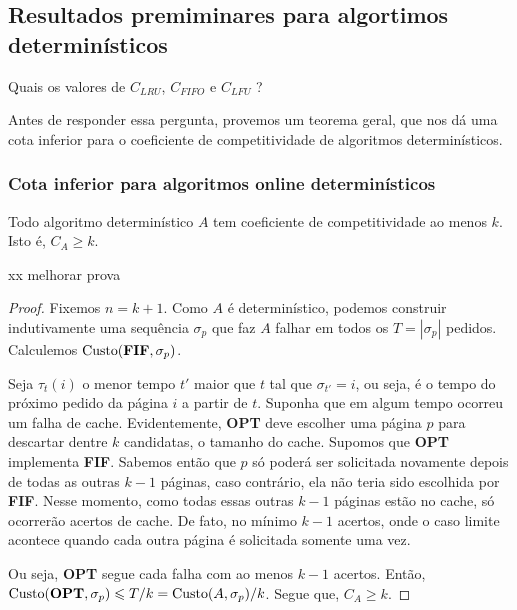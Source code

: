 \subsection{Resultados premiminares para algortimos determinísticos}

\begin{question}
  Quais os valores de \(C_{LRU}\), \(C_{FIFO}\) e \(C_{LFU}\) ?
\end{question}

Antes de responder essa pergunta, provemos um teorema geral, que nos dá uma cota inferior para o coeficiente de competitividade de algoritmos determinísticos.

\subsubsection{Cota inferior para algoritmos online determinísticos}

\begin{theorem}
\label{teorema1}
Todo algoritmo determinístico \(A\) tem coeficiente de competitividade ao menos \(k\). Isto é, \(C_A \geqslant k\).
\end{theorem}

 xx melhorar prova
\begin{proof}

  Fixemos \(n = k + 1\). Como \(A\) é determinístico, podemos construir indutivamente uma sequência \(\sigma_p\) que faz \(A\) falhar em todos os \(T = |\sigma_p|\) pedidos. Calculemos \(\text{Custo}(\bold{FIF}, \sigma_p)\). 

  Seja \(\tau_t(i)\) o menor tempo \(t'\) maior que \(t\) tal que \(\sigma_{t'} = i\), ou seja, é o tempo do próximo pedido da página \(i\) a partir de \(t\). Suponha que em algum tempo ocorreu um falha de cache. Evidentemente, \textbf{OPT} deve escolher uma página \(p\) para descartar dentre \(k\) candidatas, o tamanho do cache. Supomos que \textbf{OPT} implementa \textbf{FIF}. Sabemos então que \(p\) só poderá ser solicitada novamente depois de todas as outras \(k - 1\) páginas, caso contrário, ela não teria sido escolhida por \textbf{FIF}. Nesse momento, como todas essas outras \(k - 1\) páginas estão no cache, só ocorrerão acertos de cache. De fato, no mínimo \(k - 1\) acertos, onde o caso limite acontece quando cada outra página é solicitada somente uma vez.

  Ou seja, \textbf{OPT} segue cada falha com ao menos \(k-1\) acertos. Então, \(\text{Custo}(\bold{OPT}, \sigma_p) \leqslant T/k = \text{Custo}(A, \sigma_p)/ k\). Segue que, \(C_A \geqslant k\).
\end{proof}

